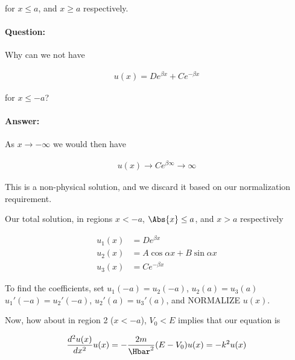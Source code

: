 {for \(x \le a\), and \(x \ge a\) respectively.

\paragraph{Question:} Why can we not have

\begin{equation}\label{eqn:PHY356Lecture9:36}
\begin{aligned}
u(x) = D e^{\beta x} + C e^{-\beta x}
\end{aligned}
\end{equation}

for \(x \le -a\)?

\paragraph{Answer:} As \(x \rightarrow -\infty\) we would then have

\begin{equation}\label{eqn:lecture9boundStates:280}
\begin{aligned}
u(x) \rightarrow C e^{\beta \infty} \rightarrow \infty
\end{aligned}
\end{equation}

This is a non-physical solution, and we discard it based on our normalization requirement.

Our total solution, in regions \(x < -a\), \(\Abs{x} \le a\), and \(x > a\) respectively

\begin{equation}\label{eqn:lecture9boundStates:300}
\begin{aligned}
u_1(x) &= D e^{\beta x} \\
u_2(x) &= A \cos\alpha x + B \sin\alpha x \\
u_3(x) &= C e^{-\beta x}
\end{aligned}
\end{equation}

To find the coefficients, set \(u_1(-a) = u_2(-a)\), \(u_2(a) = u_3(a)\) \(u_1'(-a) = u_2'(-a)\), \(u_2'(a) = u_3'(a)\), and NORMALIZE \(u(x)\).

Now, how about in region 2 (\(x < -a\)), \(V_0 < E\) implies that our equation is

\begin{equation}\label{eqn:PHY356Lecture9:40}
\begin{aligned}
\frac{d^2 u(x)}{dx^2} u(x) = - \frac{2m}{\Hbar^2} (E - V_0) u(x) = - k^2 u(x)
\end{aligned}
\end{equation}

}
